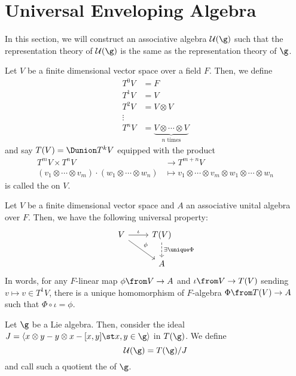 \documentclass[11pt,leqno,oneside]{amsart}
\numberwithin{thm}{section}
\newcommand{\T}{T}
\newcommand{\U}{\mathcal{U}}
\begin{document}
\section{Universal Enveloping Algebra}
In this section, we will construct an associative algebra \(\U(\g)\)
such that the representation theory of \(\U(\g)\) is the same as the
representation theory of \(\g\).
\begin{defn}
  Let \(V\) be a finite dimensional vector space over a field
  \(F\). Then, we define
  \begin{align*}
    \T^0 V & = F \\
    \T^1 V & = V \\
    \T^2 V & = V \otimes V \\
    \vdots & \\
    \T^n V & = \underbrace {V \otimes \cdots \otimes V }_{n \text{ times}}
  \end{align*}
  and say \(\T(V) = \Dunion \T^k V\) equipped with the product
  \begin{align*}
    \T^m V \times \T^n V & \to T^{m+n}V\\
    (v_1 \otimes \cdots \otimes v_m) \cdot (w_1 \otimes \cdots \otimes
    w_n) & \mapsto v_1 \otimes \cdots \otimes v_m \otimes w_1 \otimes
           \cdots \otimes w_n
  \end{align*}
  is called the  on \(V\).
\end{defn}
\begin{prop}
  Let \(V\) be a finite dimensional vector space and \(A\) an
  associative unital algebra over \(F\). Then, we have the
  following universal property:
  \[
    \begin{tikzcd}
      V \ar[r,"\iota"] \ar[rd, "\phi"]& \T(V) \ar[d, dashed, "\exists
      \unique \Phi"] \\ 
      & A
    \end{tikzcd}
  \]
  In words, for any \(F\)-linear map \(\phi \from V \to A\) and
  \(\iota \from V \to \T(V)\) sending \(v \mapsto v \in T^1 V\), there
  is a unique homomorphism of \(F\)-algebra \(\Phi \from \T(V) \to A\)
  such that \(\Phi \circ \iota = \phi\).
\end{prop}
\begin{defn}
  Let \(\g\) be a Lie algebra. Then, consider the ideal \(J = \langle
  x \otimes y - y \otimes x - [x,y] \st x,y \in \g \rangle\) in
  \(\T(\g)\). We define \[
    \U(\g) = T(\g) / J
  \]
  and call such a quotient the  of \(\g\).
\end{defn}
\end{document}
